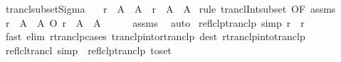 \begin{isabellebody}
\isadelimproof
\isanewline
%
\endisadelimproof
\isanewline
{}\isamarkupfalse%
\ trancl{\isacharunderscore}{\kern0pt}subset{\isacharunderscore}{\kern0pt}Sigma{\isacharcolon}{\kern0pt}\isanewline
\ \ \ {\isachardoublequoteopen}r\ {\isasymsubseteq}\ A\ {\isasymtimes}\ A{\isachardoublequoteclose}\ \ {\isachardoublequoteopen}r\isactrlsup {\isacharplus}{\kern0pt}\ {\isasymsubseteq}\ A\ {\isasymtimes}\ A{\isachardoublequoteclose}\isanewline
%
\isadelimproof
%
\endisadelimproof
%
\isatagproof
{}\isamarkupfalse%
\ {\isacharparenleft}{\kern0pt}rule\ trancl{\isacharunderscore}{\kern0pt}Int{\isacharunderscore}{\kern0pt}subset\ {\isacharbrackleft}{\kern0pt}OF\ assms{\isacharbrackright}{\kern0pt}{\isacharparenright}{\kern0pt}\isanewline
\ \ \isamarkupfalse%
\ {\isachardoublequoteopen}{\isacharparenleft}{\kern0pt}r\isactrlsup {\isacharplus}{\kern0pt}\ {\isasyminter}\ A\ {\isasymtimes}\ A{\isacharparenright}{\kern0pt}\ O\ r\ {\isasymsubseteq}\ A\ {\isasymtimes}\ A{\isachardoublequoteclose}\isanewline
\ \ \ \ \isamarkupfalse%
\ assms\ \isamarkupfalse%
\ auto\isanewline
{}\isamarkupfalse%
%
\endisatagproof
{\isafoldproof}%
%
\isadelimproof
\isanewline
%
\endisadelimproof
\isanewline
{}\isamarkupfalse%
\ reflclp{\isacharunderscore}{\kern0pt}tranclp\ {\isacharbrackleft}{\kern0pt}simp{\isacharbrackright}{\kern0pt}{\isacharcolon}{\kern0pt}\ {\isachardoublequoteopen}{\isacharparenleft}{\kern0pt}r\isactrlsup {\isacharplus}{\kern0pt}\isactrlsup {\isacharplus}{\kern0pt}{\isacharparenright}{\kern0pt}\isactrlsup {\isacharequal}{\kern0pt}\isactrlsup {\isacharequal}{\kern0pt}\ {\isacharequal}{\kern0pt}\ r\isactrlsup {\isacharasterisk}{\kern0pt}\isactrlsup {\isacharasterisk}{\kern0pt}{\isachardoublequoteclose}\isanewline
%
\isadelimproof
\ \ %
\endisadelimproof
%
\isatagproof
{}\isamarkupfalse%
\ {\isacharparenleft}{\kern0pt}fast\ elim{\isacharcolon}{\kern0pt}\ rtranclp{\isachardot}{\kern0pt}cases\ tranclp{\isacharunderscore}{\kern0pt}into{\isacharunderscore}{\kern0pt}rtranclp\ dest{\isacharcolon}{\kern0pt}\ rtranclp{\isacharunderscore}{\kern0pt}into{\isacharunderscore}{\kern0pt}tranclp{}{\isacharparenright}{\kern0pt}%
\endisatagproof
{\isafoldproof}%
%
\isadelimproof
\isanewline
%
\endisadelimproof
\isanewline
{}\isamarkupfalse%
\ reflcl{\isacharunderscore}{\kern0pt}trancl\ {\isacharbrackleft}{\kern0pt}simp{\isacharbrackright}{\kern0pt}\ {\isacharequal}{\kern0pt}\ reflclp{\isacharunderscore}{\kern0pt}tranclp\ {\isacharbrackleft}{\kern0pt}to{\isacharunderscore}{\kern0pt}set{\isacharbrackright}{\kern0pt}\isanewline

\end{isabellebody}
